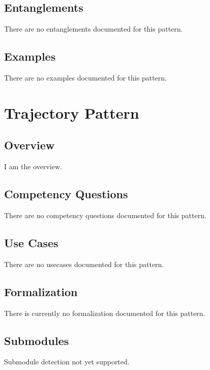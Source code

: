 \subsection{Entanglements}
\label{ssec:entanglements}
There are no entanglements documented for this pattern.

\subsection{Examples}
\label{ssec:examples}
There are no examples documented for this pattern.


\section{Trajectory Pattern}
\label{sec:trajectory-pattern}
\subsection{Overview}
\label{ssec:overview}
I am the overview.

\subsection{Competency Questions}
\label{ssec:cqs}
There are no competency questions documented for this pattern.

\subsection{Use Cases}
\label{ssec:use-cases}
There are no usecases documented for this pattern.
\subsection{Formalization}
\label{ssec:formalization}
There is currently no formalization documented for this pattern.

\subsection{Submodules}
\label{ssec:submodules}
Submodule detection not yet supported.

